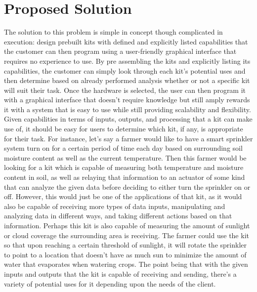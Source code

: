 \documentclass[onecolumn, draftclsnofoot,10pt, compsoc]{IEEEtran}
\begin{document}
\section{Proposed Solution}
The solution to this problem is simple in concept though complicated in execution: design prebuilt kits with defined and explicitly listed capabilities that the customer can then program using a user-friendly graphical interface that requires no experience to use.
By pre assembling the kits and explicitly listing its capabilities, the customer can simply look through each kit’s potential uses and then determine based on already performed analysis whether or not a specific kit will suit their task.
Once the hardware is selected, the user can then program it with a graphical interface that doesn’t require knowledge but still amply rewards it with a system that is easy to use while still providing scalability and flexibility.
Given capabilities in terms of inputs, outputs, and processing that a kit can make use of, it should be easy for users to determine which kit, if any, is appropriate for their task. 
For instance, let’s say a farmer would like to have a smart sprinkler system turn on for a certain period of time each day based on surrounding soil moisture content as well as the current temperature.
Then this farmer would be looking for a kit which is capable of measuring both temperature and moisture content in soil, as well as relaying that information to an actuator of some kind that can analyze the given data before deciding to either turn the sprinkler on or off.
However, this would just be one of the applications of that kit, as it would also be capable of receiving more types of data inputs, manipulating and analyzing data in different ways, and taking different actions based on that information.
Perhaps this kit is also capable of measuring the amount of sunlight or cloud coverage the surrounding area is receiving.
The farmer could use the kit so that upon reaching a certain threshold of sunlight, it will rotate the sprinkler to point to a location that doesn’t have as much sun to minimize the amount of water that evaporates when watering crops.
The point being that with the given inputs and outputs that the kit is capable of receiving and sending, there’s a variety of potential uses for it depending upon the needs of the client. 
\end{document}
